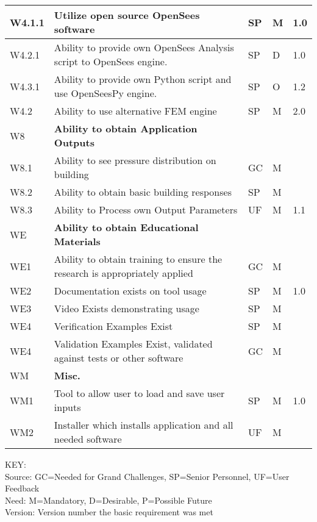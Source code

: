 \begin{longtable}{| p{} | p{} | p{} | p{} |  p{} |}
W4.1.1 & Utilize open source OpenSees software & SP & M & 1.0 \\ \hline
W4.2.1 & Ability to provide own OpenSees Analysis script to OpenSees engine. & SP & D & 1.0 \\ \hline
W4.3.1 & Ability to provide own Python script and use OpenSeesPy engine. & SP & O & 1.2 \\ \hline
W4.2 & Ability to use alternative FEM engine & SP & M & 2.0 \\ \hhline{=====}




    W8 & \textbf{Ability to obtain Application Outputs} &  & & \\ \hline
    W8.1 & Ability to see pressure distribution on building & GC & M &   \\ \hline
    W8.2 & Ability to obtain basic building responses & SP & M &   \\ \hline
    W8.3 & Ability to Process own Output Parameters & UF & M & 1.1  \\ \hhline{=====}
    WE & \textbf{Ability to obtain Educational Materials} &  &  & \\ \hline
    WE1 & Ability to obtain training to ensure the research is appropriately applied & GC & M & \\ \hline 
    WE2 & Documentation exists on tool usage & SP & M & 1.0  \\ \hline
    WE3 & Video Exists demonstrating usage & SP & M &  \\ \hline
    WE4 & Verification Examples Exist & SP & M &   \\ \hline
    WE4 & Validation Examples Exist, validated against tests or other software & GC & M &  \\\hhline{=====}
    WM & \textbf{Misc.} &  &  & \\ \hline
    WM1 & Tool to allow user to load and save user inputs & SP & M & 1.0 \\ \hline
    WM2 & Installer which installs application and all needed software & UF & M &   \\ \hline
	\bottomrule 
               
\end{longtable}

\noindent
KEY:\\
Source: GC=Needed for Grand Challenges, SP=Senior Personnel, UF=User Feedback \\
Need: M=Mandatory, D=Desirable, P=Possible Future \\
Version: Version number the basic requirement was met 


